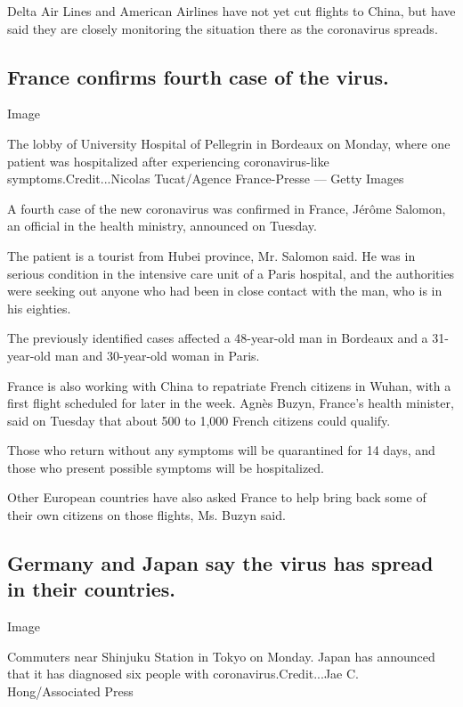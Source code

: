 Delta Air Lines and American Airlines have not yet cut flights to China,
but have said they are closely monitoring the situation there as the
coronavirus spreads.

\hypertarget{france-confirms-fourth-case-of-the-virus}{%
\subsection{France confirms fourth case of the
virus.}\label{france-confirms-fourth-case-of-the-virus}}

Image

The lobby of University Hospital of Pellegrin in Bordeaux on Monday,
where one patient was hospitalized after experiencing coronavirus-like
symptoms.Credit...Nicolas Tucat/Agence France-Presse --- Getty Images

A fourth case of the new coronavirus was confirmed in France, Jérôme
Salomon, an official in the health ministry, announced on Tuesday.

The patient is a tourist from Hubei province, Mr. Salomon said. He was
in serious condition in the intensive care unit of a Paris hospital, and
the authorities were seeking out anyone who had been in close contact
with the man, who is in his eighties.

The previously identified cases affected a 48-year-old man in Bordeaux
and a 31-year-old man and 30-year-old woman in Paris.

France is also working with China to repatriate French citizens in
Wuhan, with a first flight scheduled for later in the week. Agnès Buzyn,
France's health minister, said on Tuesday that about 500 to 1,000 French
citizens could qualify.

Those who return without any symptoms will be quarantined for 14 days,
and those who present possible symptoms will be hospitalized.

Other European countries have also asked France to help bring back some
of their own citizens on those flights, Ms. Buzyn said.

\hypertarget{germany-and-japan-say-the-virus-has-spread-in-their-countries}{%
\subsection{Germany and Japan say the virus has spread in their
countries.}\label{germany-and-japan-say-the-virus-has-spread-in-their-countries}}

Image

Commuters near Shinjuku Station in Tokyo on Monday. Japan has announced
that it has diagnosed six people with coronavirus.Credit...Jae C.
Hong/Associated Press

